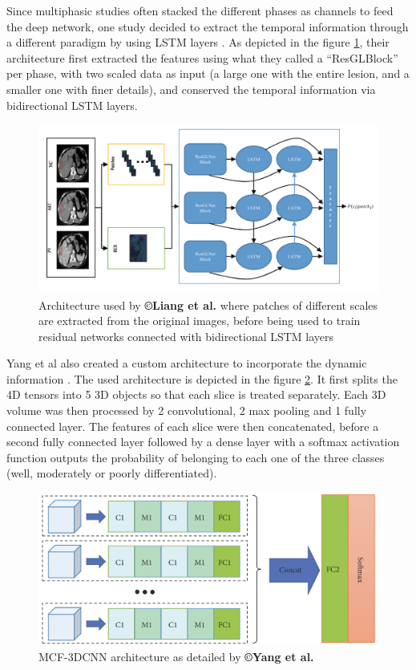 Since multiphasic studies often stacked the different phases as channels
to feed the deep network, one study decided to extract the temporal
information through a different paradigm by using LSTM layers \cite{Liang2018}. As depicted
in the figure \ref{Liang2018_Fig1}, their architecture first extracted the features using what they
called a ``ResGLBlock'' per phase, with two scaled data as input (a
large one with the entire lesion, and a smaller one with finer details),
and conserved the temporal information via bidirectional LSTM
layers.

\begin{figure}[th!]
\centering
\includegraphics[width=0.7\linewidth]{images/image7_crop}
\caption{Architecture used by \textbf{©Liang et al.} where patches of different scales are extracted from the original images, before being used to train residual networks connected with bidirectional LSTM layers \cite{Liang2018}}
\label{Liang2018_Fig1}
\end{figure}

Yang et al also created a custom architecture to incorporate the dynamic information \cite{Yang2019}.
The used architecture is depicted in the figure \ref{fig:Yang2019_Figure2_MCF-3DCNN}. It first splits the 4D
tensors into 5 3D objects so that each slice is treated separately. Each
3D volume was then processed by 2 convolutional, 2 max pooling and 1
fully connected layer. The features of each slice were then
concatenated, before a second fully connected layer followed by a dense
layer with a softmax activation function outputs the probability of
belonging to each one of the three classes (well, moderately or poorly differentiated).

\begin{figure}[th!]
	\centering
	\includegraphics[width=0.7\linewidth]{../HistologicalGradePrediction/images/Yang2019_Fig2}
	\caption{MCF-3DCNN architecture as detailed by \textbf{©Yang et al. \cite{Yang2019}}}
	\label{fig:Yang2019_Figure2_MCF-3DCNN}
\end{figure}


